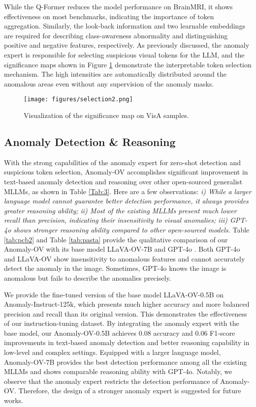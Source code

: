 While the Q-Former reduces the model performance on BrainMRI, it shows effectiveness on most benchmarks, indicating the importance of token aggregation. Similarly, the look-back information and two learnable embeddings are required for describing class-awareness abnormality and distinguishing positive and negative features, respectively. As previously discussed, the anomaly expert is responsible for selecting suspicious visual tokens for the LLM, and the significance maps shown in Figure \ref{fig:selection} demonstrate the interpretable token selection mechanism. The high intensities are automatically distributed around the anomalous areas even without any supervision of the anomaly masks. 

\begin{figure}[ht]
\centering
    \texttt{[image: figures/selection2.png]}
\caption{Visualization of the significance map on VisA samples.} 
\label{fig:selection}
\vspace{-4mm}
\end{figure}




\subsection{Anomaly Detection \& Reasoning}

With the strong capabilities of the anomaly expert for zero-shot detection and suspicious token selection, Anomaly-OV accomplishes significant improvement in text-based anomaly detection and reasoning over other open-sourced generalist MLLMs, as shown in Table \ref{Tab:3}. Here are a few observations: \textit{i) While a larger language model cannot guarantee better detection performance, it always provides greater reasoning ability; ii) Most of the existing MLLMs present much lower recall than precision, indicating their insensitivity to visual anomalies; iii) GPT-4o shows stronger reasoning ability compared to other open-sourced models.} Table \ref{tab:pcb2} and Table \ref{tab:pasta} provide the qualitative comparison of our Anomaly-OV with its base model LLaVA-OV-7B \cite{llavaonevision} and GPT-4o \cite{gpt-api-4o}. Both GPT-4o and LLaVA-OV show insensitivity to anomalous features and cannot accurately detect the anomaly in the image. Sometimes, GPT-4o knows the image is anomalous but fails to describe the anomalies precisely.

We provide the fine-tuned version of the base model LLaVA-OV-0.5B on Anomaly-Instruct-125k, which presents much higher accuracy and more balanced precision and recall than its original version. This demonstrates the effectiveness of our instruction-tuning dataset. By integrating the anomaly expert with the base model, our Anomaly-OV-0.5B achieves $0.08$ accuracy and $0.06$ F1-score improvements in text-based anomaly detection and better reasoning capability in low-level and complex settings. Equipped with a larger language model, Anomaly-OV-7B provides the best detection performance among all the existing MLLMs and shows comparable reasoning ability with GPT-4o. Notably, we observe that the anomaly expert restricts the detection performance of Anomaly-OV. Therefore, the design of a stronger anomaly expert is suggested for future works.


